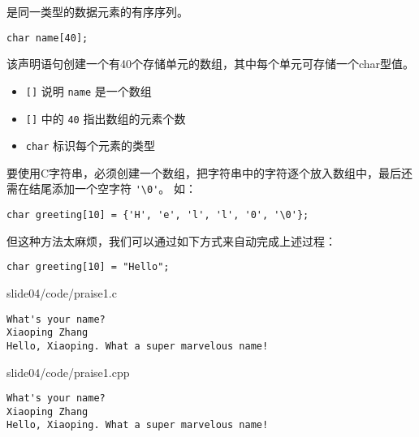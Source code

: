 \begin{frame}[fragile]\ft{\secname}
\begin{defn}[数组（array）]{}
是同一类型的数据元素的有序序列。
\end{defn}
\pause

\begin{lstlisting}
char name[40];
\end{lstlisting}
该声明语句创建一个有40个存储单元的数组，其中每个单元可存储一个char型值。
\pause \vspace{0.1in}

\begin{itemize}
\item \lstinline|[]| 说明 \lstinline|name| 是一个数组\\[0.1in]
\item \lstinline|[]| 中的 \lstinline|40| 指出数组的元素个数\\[0.1in]
\item \lstinline|char| 标识每个元素的类型
\end{itemize}
\end{frame}


\begin{frame}[fragile]
  要使用C字符串，必须创建一个数组，把字符串中的字符逐个放入数组中，最后还需在结尾添加一个空字符 \lstinline|'\0'|。 如：
  \begin{lstlisting}
char greeting[10] = {'H', 'e', 'l', 'l', '0', '\0'};    
\end{lstlisting} \pause

但这种方法太麻烦，我们可以通过如下方式来自动完成上述过程：
  \begin{lstlisting}
char greeting[10] = "Hello";
\end{lstlisting}  
\end{frame}

\begin{frame}[fragile]
  
  {
    slide04/code/praise1.c
  }
  \pause
  
\begin{lstlisting}[backgroundcolor=\color{red!10}]
What's your name?
Xiaoping Zhang
Hello, Xiaoping. What a super marvelous name!
\end{lstlisting}

\end{frame}

\begin{frame}[fragile]
  
  {
    slide04/code/praise1.cpp
  }
  \pause
  
\begin{lstlisting}[backgroundcolor=\color{red!10}]
What's your name?
Xiaoping Zhang
Hello, Xiaoping. What a super marvelous name!
\end{lstlisting}

\end{frame}

